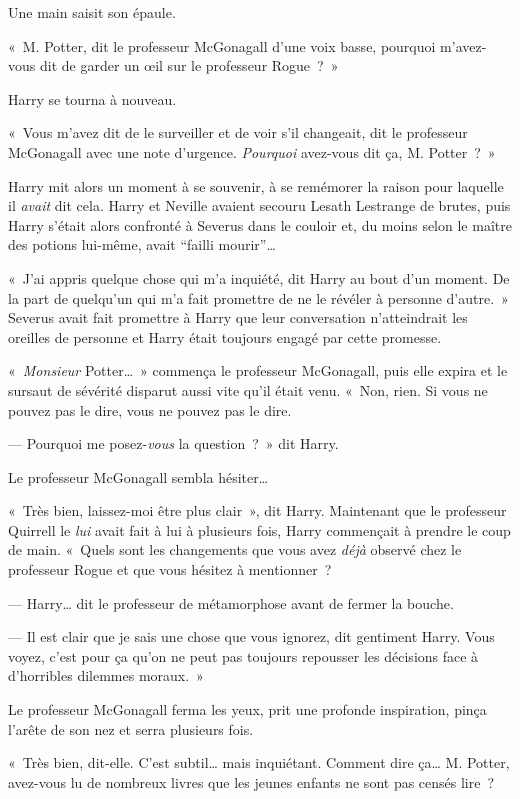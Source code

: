 Une main saisit son épaule.

«~M. Potter, dit le professeur McGonagall d'une voix basse, pourquoi m'avez-vous dit de garder un œil sur le professeur Rogue~?~»

Harry se tourna à nouveau.

«~Vous m'avez dit de le surveiller et de voir s'il changeait, dit le professeur McGonagall avec une note d'urgence.
\emph{Pourquoi} avez-vous dit ça, M. Potter~?~»

Harry mit alors un moment à se souvenir, à se remémorer la raison pour laquelle il \emph{avait} dit cela.
Harry et Neville avaient secouru Lesath Lestrange de brutes, puis Harry s'était alors confronté à Severus dans le couloir et, du moins selon le maître des potions lui-même, avait “failli mourir”…

«~J'ai appris quelque chose qui m'a inquiété, dit Harry au bout d'un moment.
De la part de quelqu'un qui m'a fait promettre de ne le révéler à personne d'autre.~»
Severus avait fait promettre à Harry que leur conversation n'atteindrait les oreilles de personne et Harry était toujours engagé par cette promesse.

«~\emph{Monsieur} Potter…~»
commença le professeur McGonagall, puis elle expira et le sursaut de sévérité disparut aussi vite qu'il était venu.
«~Non, rien.
Si vous ne pouvez pas le dire, vous ne pouvez pas le dire.

--- Pourquoi me posez-\emph{vous} la question~?~»
dit Harry.

Le professeur McGonagall sembla hésiter…

«~Très bien, laissez-moi être plus clair~», dit Harry.
Maintenant que le professeur Quirrell le \emph{lui} avait fait à lui à plusieurs fois, Harry commençait à prendre le coup de main.
«~Quels sont les changements que vous avez \emph{déjà} observé chez le professeur Rogue et que vous hésitez à mentionner~?

--- Harry… dit le professeur de métamorphose avant de fermer la bouche.

--- Il est clair que je sais une chose que vous ignorez, dit gentiment Harry.
Vous voyez, c'est pour ça qu'on ne peut pas toujours repousser les décisions face à d'horribles dilemmes moraux.~»

Le professeur McGonagall ferma les yeux, prit une profonde inspiration, pinça l'arête de son nez et serra plusieurs fois.

«~Très bien, dit-elle.
C'est subtil… mais inquiétant.
Comment dire ça…
M. Potter, avez-vous lu de nombreux livres que les jeunes enfants ne sont pas censés lire~?

